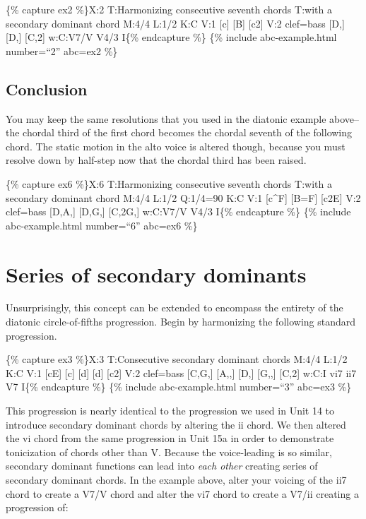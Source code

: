 \documentclass{book}
\begin{document}
\{\% capture ex2 \%\}X:2 T:Harmonizing consecutive seventh chords T:with a
secondary dominant chord M:4/4 L:1/2 K:C V:1 {[}c{]} {[}B{]}\textbar{}
{[}c2{]}\textbar{]} V:2 clef=bass {[}D,{]} {[}D,{]}\textbar{}
{[}C,2{]}\textbar{]} w:C:V7/V V4/3 I\{\% endcapture \%\} \{\% include
abc-example.html number=``2'' abc=ex2 \%\}

\hypertarget{conclusion-22}{%
\subsection{Conclusion}\label{conclusion-22}}

You may keep the same resolutions that you used in the diatonic example
above--the chordal third of the first chord becomes the chordal seventh of the
following chord. The static motion in the alto voice is altered though,
because you must resolve down by half-step now that the chordal third has been
raised.

\{\% capture ex6 \%\}X:6 T:Harmonizing consecutive seventh chords T:with a
secondary dominant chord M:4/4 L:1/2 Q:1/4=90 K:C V:1 {[}c\^{}F{]}
{[}B=F{]}\textbar{} {[}c2E{]}\textbar{]} V:2 clef=bass {[}D,A,{]}
{[}D,G,{]}\textbar{} {[}C,2G,{]}\textbar{]} w:C:V7/V V4/3 I\{\% endcapture
\%\} \{\% include abc-example.html number=``6'' abc=ex6 \%\}

\hypertarget{series-of-secondary-dominants}{%
\section{Series of secondary dominants}\label{series-of-secondary-dominants}}

Unsurprisingly, this concept can be extended to encompass the entirety of the
diatonic circle-of-fifths progression. Begin by harmonizing the following
standard progression.

\{\% capture ex3 \%\}X:3 T:Consecutive secondary dominant chords M:4/4 L:1/2
K:C V:1 {[}cE{]} {[}c{]}\textbar{} {[}d{]} {[}d{]}\textbar{}
{[}c2{]}\textbar{]} V:2 clef=bass {[}C,G,{]} {[}A,,{]}\textbar{} {[}D,{]}
{[}G,,{]}\textbar{} {[}C,2{]}\textbar{]} w:C:I vi7 ii7 V7 I\{\% endcapture
\%\} \{\% include abc-example.html number=``3'' abc=ex3 \%\}

This progression is nearly identical to the progression we used in Unit 14 to
introduce secondary dominant chords by altering the ii chord. We then altered
the vi chord from the same progression in Unit 15a in order to demonstrate
tonicization of chords other than V. Because the voice-leading is so similar,
secondary dominant functions can lead into \emph{each other} creating series
of secondary dominant chords. In the example above, alter your voicing of the
ii7 chord to create a V7/V chord and alter the vi7 chord to create a V7/ii
creating a progression of:
\end{document}

